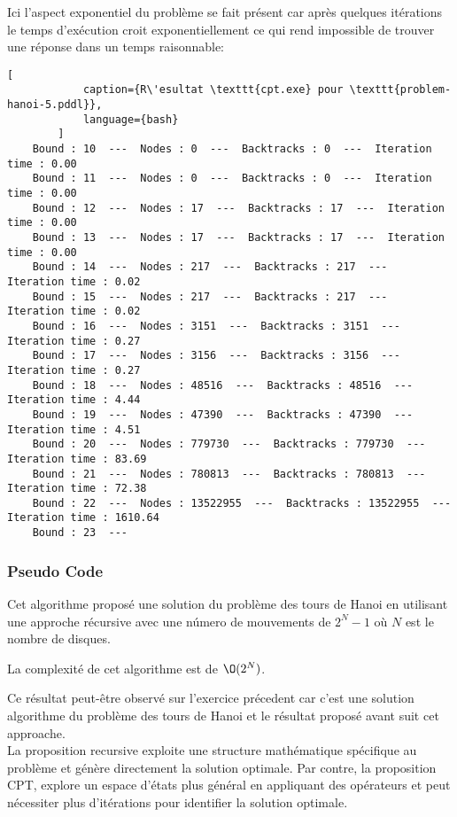 \documentclass[../CSC_5RO16_TA_TP5.tex]{subfiles}
\begin{document}
\begin{remark}
    Ici l'aspect exponentiel du problème se fait présent car après quelques itérations le temps d'exécution croit exponentiellement ce qui rend impossible de trouver une réponse dans un temps raisonnable:\\

    \begin{scriptsize}\mycode
        \begin{lstlisting}[
            caption={R\'esultat \texttt{cpt.exe} pour \texttt{problem-hanoi-5.pddl}},
            language={bash}
        ]
    Bound : 10  ---  Nodes : 0  ---  Backtracks : 0  ---  Iteration time : 0.00
    Bound : 11  ---  Nodes : 0  ---  Backtracks : 0  ---  Iteration time : 0.00
    Bound : 12  ---  Nodes : 17  ---  Backtracks : 17  ---  Iteration time : 0.00
    Bound : 13  ---  Nodes : 17  ---  Backtracks : 17  ---  Iteration time : 0.00
    Bound : 14  ---  Nodes : 217  ---  Backtracks : 217  ---  Iteration time : 0.02
    Bound : 15  ---  Nodes : 217  ---  Backtracks : 217  ---  Iteration time : 0.02
    Bound : 16  ---  Nodes : 3151  ---  Backtracks : 3151  ---  Iteration time : 0.27
    Bound : 17  ---  Nodes : 3156  ---  Backtracks : 3156  ---  Iteration time : 0.27
    Bound : 18  ---  Nodes : 48516  ---  Backtracks : 48516  ---  Iteration time : 4.44
    Bound : 19  ---  Nodes : 47390  ---  Backtracks : 47390  ---  Iteration time : 4.51
    Bound : 20  ---  Nodes : 779730  ---  Backtracks : 779730  ---  Iteration time : 83.69
    Bound : 21  ---  Nodes : 780813  ---  Backtracks : 780813  ---  Iteration time : 72.38
    Bound : 22  ---  Nodes : 13522955  ---  Backtracks : 13522955  ---  Iteration time : 1610.64
    Bound : 23  ---
        \end{lstlisting}
    \end{scriptsize}
\end{remark}

\subsubsection{Pseudo Code}
\noindent Cet algorithme proposé une solution du problème des tours de Hanoi en utilisant une approche récursive avec une número de mouvements de $2^{N} - 1$ où $N$ est le nombre de disques.\\

\begin{remark}
    La complexité de cet algorithme est de $\O (2^N)$.
\end{remark}

\noindent Ce résultat peut-être observé sur l'exercice précedent car c'est une solution algorithme du problème des tours de Hanoi et le résultat proposé avant suit cet approache.\\

\noindent La proposition recursive exploite une structure mathématique spécifique au problème et génère directement la solution optimale. Par contre, la proposition CPT, explore un espace d'états plus général en appliquant des opérateurs et peut nécessiter plus d'itérations pour identifier la solution optimale.
\end{document}
